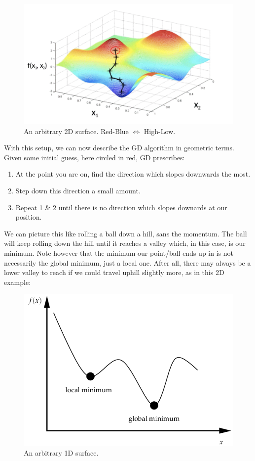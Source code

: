 \documentclass{article}
\begin{document}
  \begin{figure}[h]
    \centering
    \includegraphics[scale=.5]{hill}
    \caption{An arbitrary 2D surface. Red-Blue $\iff$ High-Low.}
  \end{figure}

  With this setup, we can now describe the GD algorithm in geometric terms. Given some initial guess, here circled in red, GD prescribes:
  \begin{enumerate}
    \item At the point you are on, find the direction which slopes downwards the most. 
    \item Step down this direction a small amount.
    \item Repeat 1 \& 2 until there is no direction which slopes downards at our position.
  \end{enumerate}

  We can picture this like rolling a ball down a hill, sans the momentum. The ball will keep rolling down the hill until it reaches a valley which, in this case, is our minimum. Note however that the minimum our point/ball ends up in is not necessarily the global minimum, just a local one. After all, there may always be a lower valley to reach if we could travel uphill slightly more, as in this 2D example:

  \begin{figure}[h]
    \centering
    \includegraphics[scale=.45]{local}
    \caption{An arbitrary 1D surface.}
  \end{figure}
\end{document}
